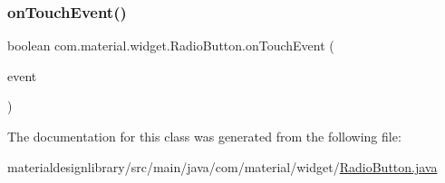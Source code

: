 \subsubsection{\texorpdfstring{on\+Touch\+Event()}{onTouchEvent()}}
{\footnotesize\ttfamily boolean com.\+material.\+widget.\+Radio\+Button.\+on\+Touch\+Event (\begin{DoxyParamCaption}\item[{@Non\+Null Motion\+Event}]{event }\end{DoxyParamCaption})}



The documentation for this class was generated from the following file\+:\begin{DoxyCompactItemize}
\item 
materialdesignlibrary/src/main/java/com/material/widget/\hyperlink{_radio_button_8java}{Radio\+Button.\+java}\end{DoxyCompactItemize}
